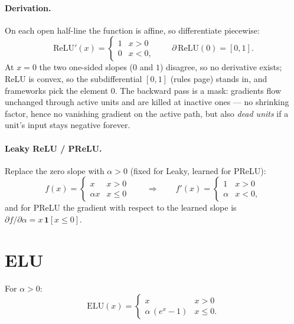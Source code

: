 \documentclass[11pt]{article}
\begin{document}
\paragraph{Derivation.} On each open half-line the function is affine,
so differentiate piecewise:
\begin{equation}
  \mathrm{ReLU}'(x) =
  \begin{cases}
    1 & x > 0\\
    0 & x < 0,
  \end{cases}
  \qquad
  \partial\,\mathrm{ReLU}(0) = [0, 1].
  \label{eq:reluprime}
\end{equation}
At $x = 0$ the two one-sided slopes ($0$ and $1$) disagree, so no
derivative exists; ReLU is convex, so the subdifferential $[0,1]$
(rules page) stands in, and frameworks pick the element $0$. The
backward pass is a mask: gradients flow unchanged through active units
and are killed at inactive ones --- no shrinking factor, hence no
vanishing gradient on the active path, but also \emph{dead units} if a
unit's input stays negative forever.

\paragraph{Leaky ReLU / PReLU.} Replace the zero slope with
$\alpha > 0$ (fixed for Leaky, learned for PReLU):
\begin{equation}
  f(x) = \begin{cases} x & x > 0\\ \alpha x & x \le 0 \end{cases}
  \qquad\Longrightarrow\qquad
  f'(x) = \begin{cases} 1 & x > 0\\ \alpha & x < 0, \end{cases}
  \label{eq:leaky}
\end{equation}
and for PReLU the gradient with respect to the learned slope is
$\partial f / \partial \alpha = x\,\mathbf{1}[x \le 0]$.

\section{ELU}

For $\alpha > 0$:
\begin{equation}
  \mathrm{ELU}(x) =
  \begin{cases}
    x & x > 0\\
    \alpha\,(e^{x} - 1) & x \le 0.
  \end{cases}
  \label{eq:elu}
\end{equation}
\end{document}
